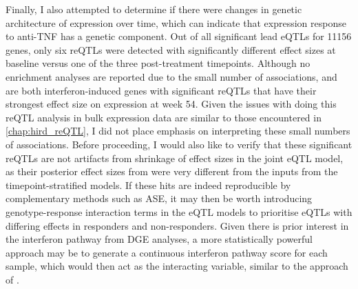 \begin{outline}
Finally, I also attempted to determine if there were changes in genetic architecture of expression over time,
which can indicate that expression response to anti-\gls{TNF} has a genetic component.
Out of all significant lead \glspl{eQTL} for 11156 genes, only six \glspl{reQTL} were detected with significantly different effect sizes at baseline versus one of the three post-treatment timepoints.
Although no enrichment analyses are reported due to the small number of associations, 
 and  are both interferon-induced genes with significant \glspl{reQTL} that have their strongest effect size on expression at week 54.
Given the issues with doing this \gls{reQTL} analysis in bulk expression data are similar to those encountered in \autoref{chap:hird_reQTL},
I did not place emphasis on interpreting these small numbers of associations.
Before proceeding, I would also like to verify that these significant \glspl{reQTL} are not artifacts from shrinkage of effect sizes in the joint \gls{eQTL} model,
as their posterior effect sizes from  were very different from the inputs from the timepoint-stratified models.
If these hits are indeed reproducible by complementary methods such as \gls{ASE}\autocite{gutierrez-arcelus2020AllelespecificExpressionChanges},
it may then be worth introducing genotype-response interaction terms in the \gls{eQTL} models
to prioritise \glspl{eQTL} with differing effects in responders and non-responders.
Given there is prior interest in the interferon pathway from \gls{DGE} analyses,
a more statistically powerful approach may be to generate a continuous interferon pathway score for each sample,
which would then act as the interacting variable,
similar to the approach of \textcite{davenport2018DiscoveringVivoCytokineeQTL}.


\end{outline}
